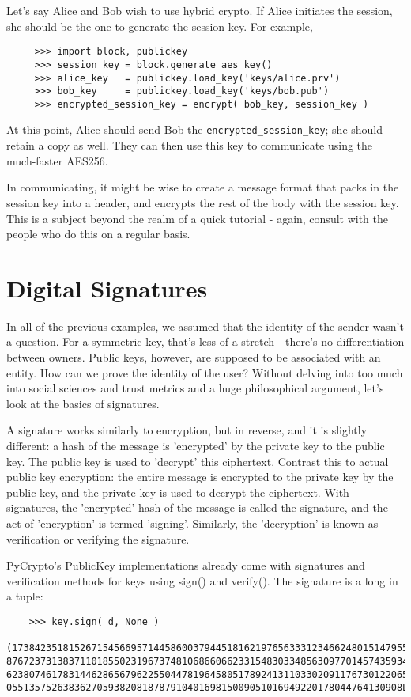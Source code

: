 \documentclass[letterpaper,10pt]{article}
\begin{document}
Let's say Alice and Bob wish to use hybrid crypto. If Alice initiates the 
session, she should be the one to generate the session key. For example,
\begin{verbatim}
     >>> import block, publickey
     >>> session_key = block.generate_aes_key()
     >>> alice_key   = publickey.load_key('keys/alice.prv')
     >>> bob_key     = publickey.load_key('keys/bob.pub')
     >>> encrypted_session_key = encrypt( bob_key, session_key )
\end{verbatim}

At this point, Alice should send Bob the \verb|encrypted_session_key|; she 
should retain a copy as well. They can then use this key to communicate using
the much-faster AES256.

In communicating, it might be wise to create a message format that packs in 
the session key into a header, and encrypts the rest of the body with the
session key. This is a subject beyond the realm of a quick tutorial - again,
consult with the people who do this on a regular basis.

\section{Digital Signatures}
In all of the previous examples, we assumed that the identity of the sender
wasn't a question. For a symmetric key, that's less of a stretch - there's no 
differentiation between owners. Public keys, however, are supposed to be
associated with an entity. How can we prove the identity of the user? Without
delving into too much into social sciences and trust metrics and a huge
philosophical argument, let's look at the basics of signatures. 

A signature works similarly to encryption, but in reverse, and it is slightly
different: a hash of the message is 'encrypted' by the private key to the 
public key. The public key is used to 'decrypt' this ciphertext. Contrast this 
to actual public key encryption: the entire message is encrypted to the private 
key by the public key, and the private key is used to decrypt the ciphertext. 
With signatures, the 'encrypted' hash of the message is called the signature,
and the act of 'encryption' is termed 'signing'. Similarly, the 'decryption' 
is known as verification or verifying the signature.

PyCrypto's PublicKey implementations already come with signatures and 
verification methods for keys using sign() and verify(). The signature
is a long in a tuple:
\begin{verbatim}
    >>> key.sign( d, None )
    (1738423518152671545669571445860037944518162197656333123466248015147955424248
876723731383711018550231967374810686606623315483033485630977014574359346192927942
623807461783144628656796225504478196458051789241311033020911767301220653148276004
0551357526383627059382081878791040169815009051016949220178044764130908L,)
\end{verbatim}
\end{document}
